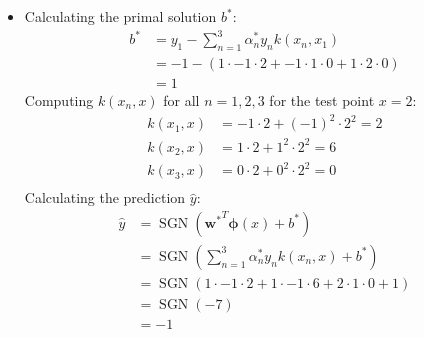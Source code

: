 \documentclass{article}
\newcommand{\mbi}[1]{\boldsymbol{#1}}
\DeclareMathOperator{\sgn}{SGN}
\begin{document}
\begin{itemize}
    \item[\textbf{3.5}] Calculating the primal solution $b^*$:
    \begin{align*}
      b^* &= y_1 - \sum_{n=1}^3 \alpha_n^* y_n k(x_n, x_1) \\
      &= -1 - (1 \cdot -1 \cdot 2 + -1 \cdot 1 \cdot 0 + 1 \cdot 2 \cdot 0) \\
      &= 1
    \end{align*}
    Computing $k(x_n, x)$ for all $n = 1, 2, 3$ for the test point $x = 2$:
    \begin{align*}
      k(x_1, x) &= -1 \cdot 2 + (-1)^2 \cdot 2^2 = 2 \\
      k(x_2, x) &= 1 \cdot 2 + 1^2 \cdot 2^2 = 6 \\
      k(x_3, x) &= 0 \cdot 2 + 0^2 \cdot 2^2 = 0 \\
    \end{align*}
    Calculating the prediction $\hat{y}$:
    \begin{align*}
      \hat{y} &= \sgn({\mbi{w}^*}^T \mbi{\phi}(x) + b^*) \\
      &= \sgn\left(\sum_{n=1}^3 \alpha_n^* y_n k(x_n, x) + b^*\right) \\
      &= \sgn(1 \cdot -1 \cdot 2 + 1 \cdot -1 \cdot 6 + 2 \cdot 1 \cdot 0 + 1) \\
      &= \sgn(-7) \\
      &= -1
    \end{align*}
  \end{itemize}
\end{document}
